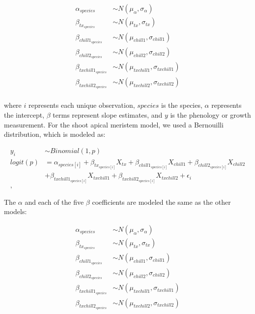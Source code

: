 \documentclass{article}\usepackage[]{graphicx}\usepackage[]{color}
\begin{document}
\begin{align*}
\alpha_{species} & \sim N(\mu_{\alpha}, \sigma_{\alpha}) \\
\beta_{tx_{species}} & \sim N(\mu_{tx}, \sigma_{tx}) \\
\beta_{chill1_{species}} & \sim N(\mu_{chill1}, \sigma_{chill1}) \\
\beta_{chill2_{species}} & \sim N(\mu_{chill2}, \sigma_{chill2}) \\
\beta_{txchill1_{species}} & \sim N(\mu_{txchill1}, \sigma_{txchill1}) \\
\beta_{txchill2_{species}} & \sim N(\mu_{txchill2}, \sigma_{txchill2}) \\
\end{align*}

where $i$ represents each unique observation, $species$ is the species, $\alpha$ represents the intercept, $\beta$ terms represent slope estimates, and $y$ is the phenology or growth measurement. For the shoot apical meristem model, we used a Bernouilli distribution, which is modeled as:

\begin{align*}
 y_i & \sim Binomial(1,p) \tag{2} \\
logit(p) &= \alpha_{species[i]} + \beta_{tx_{species[i]}}X_{tx} + \beta_{chill1_{species[i]}}X_{chill1} + \beta_{chill2_{species[i]}}X_{chill2}\\
&+ \beta_{txchill1_{species[i]}}X_{txchill1} + \beta_{txchill2_{species[i]}}X_{txchill2} + \epsilon_i \nonumber\\,
\end{align*}

The $\alpha$ and each of the five $\beta$ coefficients are modeled the same as the other models:

\begin{align*}
\alpha_{species} & \sim N(\mu_{\alpha}, \sigma_{\alpha}) \\
\beta_{tx_{species}} & \sim N(\mu_{tx}, \sigma_{tx}) \\
\beta_{chill1_{species}} & \sim N(\mu_{chill1}, \sigma_{chill1}) \\
\beta_{chill2_{species}} & \sim N(\mu_{chill2}, \sigma_{chill2}) \\
\beta_{txchill1_{species}} & \sim N(\mu_{txchill1}, \sigma_{txchill1}) \\
\beta_{txchill2_{species}} & \sim N(\mu_{txchill2}, \sigma_{txchill2}) \\
\end{align*}
\end{document}
